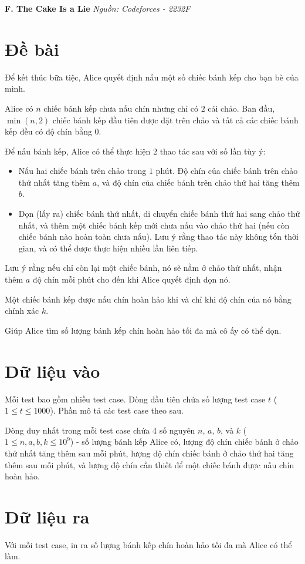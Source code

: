 \documentclass[12pt,a4paper]{article}
\newcommand{\problem}[2]{%
  \addcontentsline{toc}{section}{#1}%
  \begin{mdframed}[
    linecolor=framecolor,
    linewidth=1.5pt,
    backgroundcolor=white,
    topline=true, bottomline=true,
    leftline=true, rightline=true,
    innerleftmargin=10pt, innerrightmargin=10pt,
    innertopmargin=6pt, innerbottommargin=6pt,
  ]
  \textbf{\large #1} \hfill \textit{Nguồn: #2}
  \end{mdframed}
  \vspace{4pt}%
}
\begin{document}
\newpage
\problem{F. The Cake Is a Lie}{Codeforces - 2232F}

\section*{Đề bài}
Để kết thúc bữa tiệc, Alice quyết định nấu một số chiếc bánh kếp cho bạn bè của mình.

Alice có $n$ chiếc bánh kếp chưa nấu chín nhưng chỉ có $2$ cái chảo. Ban đầu, $\min(n, 2)$ chiếc bánh kếp đầu tiên được đặt trên chảo và tất cả các chiếc bánh kếp đều có độ chín bằng $0$.

Để nấu bánh kếp, Alice có thể thực hiện $2$ thao tác sau với số lần tùy ý:
\begin{itemize}
    \item Nấu hai chiếc bánh trên chảo trong $1$ phút. Độ chín của chiếc bánh trên chảo thứ nhất tăng thêm $a$, và độ chín của chiếc bánh trên chảo thứ hai tăng thêm $b$.
    \item Dọn (lấy ra) chiếc bánh thứ nhất, di chuyển chiếc bánh thứ hai sang chảo thứ nhất, và thêm một chiếc bánh kếp mới chưa nấu vào chảo thứ hai (nếu còn chiếc bánh nào hoàn toàn chưa nấu). Lưu ý rằng thao tác này không tốn thời gian, và có thể được thực hiện nhiều lần liên tiếp.
\end{itemize}

Lưu ý rằng nếu chỉ còn lại một chiếc bánh, nó sẽ nằm ở chảo thứ nhất, nhận thêm $a$ độ chín mỗi phút cho đến khi Alice quyết định dọn nó.

Một chiếc bánh kếp được nấu chín hoàn hảo khi và chỉ khi độ chín của nó bằng chính xác $k$.

Giúp Alice tìm số lượng bánh kếp chín hoàn hảo tối đa mà cô ấy có thể dọn.

\section*{Dữ liệu vào}
Mỗi test bao gồm nhiều test case. Dòng đầu tiên chứa số lượng test case $t$ ($1 \le t \le 1000$). Phần mô tả các test case theo sau.

Dòng duy nhất trong mỗi test case chứa 4 số nguyên $n$, $a$, $b$, và $k$ ($1 \le n, a, b, k \le 10^9$) - số lượng bánh kếp Alice có, lượng độ chín chiếc bánh ở chảo thứ nhất tăng thêm sau mỗi phút, lượng độ chín chiếc bánh ở chảo thứ hai tăng thêm sau mỗi phút, và lượng độ chín cần thiết để một chiếc bánh được nấu chín hoàn hảo.

\section*{Dữ liệu ra}
Với mỗi test case, in ra số lượng bánh kếp chín hoàn hảo tối đa mà Alice có thể làm.
\end{document}
